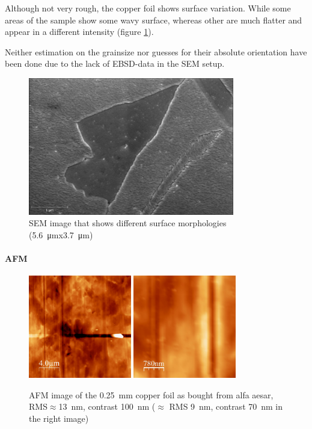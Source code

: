 Although not very rough, the copper foil shows surface variation. While some areas of the sample show some wavy surface, whereas other are much flatter and appear in a different intensity (figure \ref{SEM-surface}).

Neither estimation on the grainsize nor guesses for their absolute orientation have been done due to the lack of EBSD-data in the SEM setup.

\begin{figure}[h]
  \begin{center}
   \includegraphics[height=6cm]{./images/Domenik_16031700.jpg}
  \end{center}
 \caption{SEM image that shows different surface morphologies (\SI{5.6}{\micro \meter}x\SI{3.7}{\micro \meter})}
 \label{SEM-surface}
\end{figure}

\paragraph{AFM}
\begin{figure}[h]
 \centering
 \includegraphics[width=0.4\textwidth]{./images/as_bought0000.jpg}
 \includegraphics[width=0.4\textwidth]{./images/as_bought0001.jpg}
 \caption{AFM image of the \SI{0.25}{\mm} copper foil as bought from alfa aesar, RMS$\approx$\SI{13}{\nm}, contrast \SI{100}{\nm} ($\approx$ RMS \SI{9}{\nm}, contrast \SI{70}{\nm} in the right image)}
 \label{fig:foil-afm-as-bought}
\end{figure}

